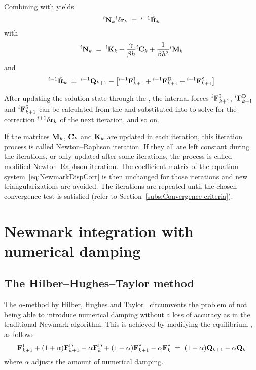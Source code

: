 Combining  with  yields
%
\begin{equation}
{}^{i}{\bf N}_k {}^{i}\delta{\bf r}_k \;=\; {}^{i-1}\hat{\bf R}_k
\label{eq:NewmarkDispCorr}
\end{equation}
%
with
%
\begin{equation}
{}^{i}{\bf N}_k \;=\; {}^{i}{\bf K}_k +
\frac{\gamma}{\beta h} {}^{i}{\bf C}_k +
\frac{1}{\beta h^2} {}^{i}{\bf M}_k
\label{eq:333}
\end{equation}
%
and
%
\begin{equation}
\ls{i-1} \hat{\mf R}_k \;=\; \ls{i-1}\Q_\kp1 - \left[
\ls{i-1}\Fi_\kp1 + \ls{i-1}\Fd_\kp1 + \ls{i-1}\Fs_\kp1
\right]
\label{eq:residual}
\end{equation}

After updating the solution state through the ,
the internal forces $\ls{i}\Fi_\kp1$, $\ls{i}\Fd_\kp1$ and $\ls{i}\Fs_\kp1$
can be calculated from the  and substituted into
 to solve for the correction ${}^{i+1}\delta{\bf r}_k$
of the next iteration, and so on.

If the matrices ${\bf M}_k$, ${\bf C}_k$ and ${\bf K}_k$ are updated in each
iteration, this iteration process is called Newton--Raphson iteration.
If they all are left constant during the iterations, or only updated after some
iterations, the process is called modified Newton--Raphson iteration.
The coefficient matrix of the equation system~\eqref{eq:NewmarkDispCorr} is then
unchanged for those iterations and new triangularizations are avoided.
The iterations are repeated until the chosen convergence test is satisfied
(refer to Section~\ref{subs:Convergence criteria}).



\section{Newmark integration with numerical damping}
\label{s:Newmark integration with numerical damping}

\subsection{The Hilber--Hughes--Taylor method}
\label{subs:The Hilber--Hughes--Taylor method}

The $\alpha$-method by Hilber, Hughes and Taylor~\cite{HHT} circumvents the
problem of not being able to introduce numerical damping without a loss of
accuracy as in the traditional Newmark algorithm.
This is achieved by modifying the equilibrium , as follows
%
\begin{equation}
\Fi_\kp1 +
(1+\alpha)\Fd_\kp1 - \alpha\Fd_k +
(1+\alpha)\Fs_\kp1 - \alpha\Fs_k \;=\;
(1+\alpha)\Q_\kp1  - \alpha\Q_k
\label{eq:NewmarkAlphaEquil}
\end{equation}
%
where $\alpha$ adjusts the amount of numerical damping.

